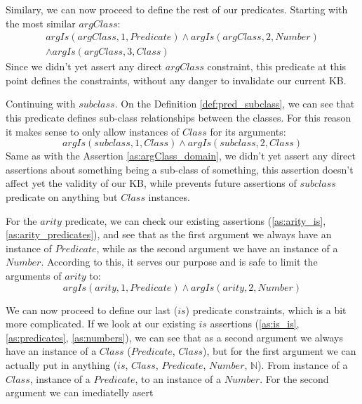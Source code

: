 Similary, we can now proceed to define the rest of our predicates. Starting with
the most similar $argClass$:
\begin{equation}\label{as:argClass_domain}
\begin{gathered}
	argIs(argClass,1,Predicate) \land argIs(argClass,2,Number) \\
	\land argIs(argClass,3,Class) 
\end{gathered}
\end{equation}
Since we didn't yet assert any direct $argClass$ constraint, this predicate
at this point defines the constraints, without any danger to invalidate our
current KB. 

Continuing with $subclass$. On the Definition \ref{def:pred_subclass}, 
we can see that this
predicate defines sub-class relationships between the classes. For this reason
it makes sense to only allow instances of $Class$ for its arguments:
\begin{equation}\label{as:subclass_is_constraint}
	argIs(subclass,1,Class) \land argIs(subclass,2,Class)
\end{equation}
Same as with the Assertion \ref{as:argClass_domain}, we didn't yet assert any 
direct assertions about something being a sub-class of something, this assertion
doesn't affect yet the validity of our KB, while prevents future assertions of 
$subclass$ predicate on anything but $Class$ instances.

For the $arity$ predicate, we can check our existing assertions 
(\ref{as:arity_is}, \ref{as:arity_predicates}), and
see that as the first argument we always have an instance of $Predicate$, while
as the second argument we have an instance of a $Number$. According to this, it
serves our purpose and is safe to limit the arguments of $arity$ to:
\begin{equation}\label{as:arity_is_constraint}
	argIs(arity,1,Predicate) \land argIs(arity,2,Number)
\end{equation}

We can now proceed to define our last ($is$) predicate constraints, which is
a bit more complicated. If we look at our existing  $is$ assertions 
(\ref{as:is_is}, \ref{as:predicates}, \ref{as:numbers}), we can
see that as a second argument we always have an instance of a $Class$ 
($Predicate$, $Class$), but
for the first argument we can actually put in anything ($is$, $Class$, 
$Predicate$,  $Number$, $\mathbb{N}$). From instance of a $Class$,
instance of a $Predicate$, to an instance of a $Number$. For the second argument
we can imediatelly asert

